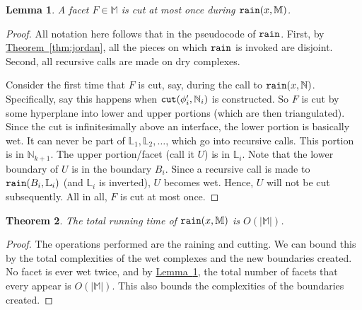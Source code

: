 \documentclass[11pt]{article}
\newcommand{\ignore}[1]{}
\newtheorem{theorem}{Theorem}
\newtheorem{lemma}[theorem]{Lemma}
\theoremstyle{definition}
\newcommand{\LL}{\mathbb{L}}
\newcommand{\MM}{\mathbb{M}}
\newcommand{\NN}{\mathbb{N}}
\newcommand{\Thm}[1]{\hyperref[thm:#1]{Theorem~\ref*{thm:#1}}} %
\newcommand{\Lem}[1]{\hyperref[lem:#1]{Lemma~\ref*{lem:#1}}} %
\newcommand{\cut}{{\tt cut}}
\newcommand{\lift}{{\tt lift}}
\newcommand{\rain}{{\tt rain}}
\begin{document}
\begin{lemma}\label{lem:new-verts}
A facet $F \in \MM$ is cut at most once during $\rain(x,\MM)$.
\end{lemma}
\begin{proof} All notation here follows that in the pseudocode of $\rain$.
First, by \Thm{jordan}, all the pieces on which $\rain$ is invoked are disjoint.
Second, all recursive calls are made on dry complexes.

Consider the first time that $F$ is cut, say, during the call to $\rain(x,\NN)$.
Specifically, say this happens when $\cut(\phi'_i,\NN_i)$ is constructed. 
So $F$ is cut by some hyperplane into lower and upper portions (which are then triangulated).
Since the cut is infinitesimally above an interface, the lower portion is basically wet.
It can never be part of $\LL_1, \LL_2, \ldots$, which go into recursive calls. This portion
is in $\NN_{k+1}$. The upper portion/facet (call it $U$) is in $\LL_i$. Note that the lower
boundary of $U$ is in the boundary $B_i$. Since a recursive call is made to $\rain(B_i,\LL_i)$
(and $\LL_i$ is inverted), $U$ becomes wet. Hence, $U$ will not be cut subsequently.
All in all, $F$ is cut at most once.
\ignore{
As the number of edges is $O(n)$, arguing that there is at most one boundary vertex created along any given edge will imply the claim.
Consider some edge $e$ and take the first time a boundary vertex is created in $e$.
This happens when some contour $\phi$ intersects $e$. On applying $\cut(\NN,\lift(\phi))$,
consider the dry manifold $\LL$ and wet manifold $\MM$ constructed. The edge $e$ is split into two parts, the dry and wet part.
The wet part is in $\MM$ and will never be involved in any recursive call.

The dry part of $e$ (call it $e'$) needs to be considered.
A boundary vertex $v$ (an new endpoint of $e$) is created, which is part of the boundary $B$ in $\LL$,
such that $\rain(B,\LL)$ is called to the inverted $\LL$. In this call, since the water starts from $v$,
all of $e'$ becomes wet. So there is no further interface contour that can intersect this portion of $e'$.
}
\end{proof}


\begin{theorem} \label{thm:rain-time} The total running time of $\rain(x,\MM)$ is $O(|\MM|)$.
\end{theorem}

\begin{proof} The operations performed are the raining and cutting. We can bound this by the total
complexities of the wet complexes and the new boundaries created. No facet is ever wet twice,
and by \Lem{new-verts}, the total number of facets that every appear is $O(|\MM|)$. This also 
bounds the complexities of the boundaries created.
\end{proof}
\end{document}
